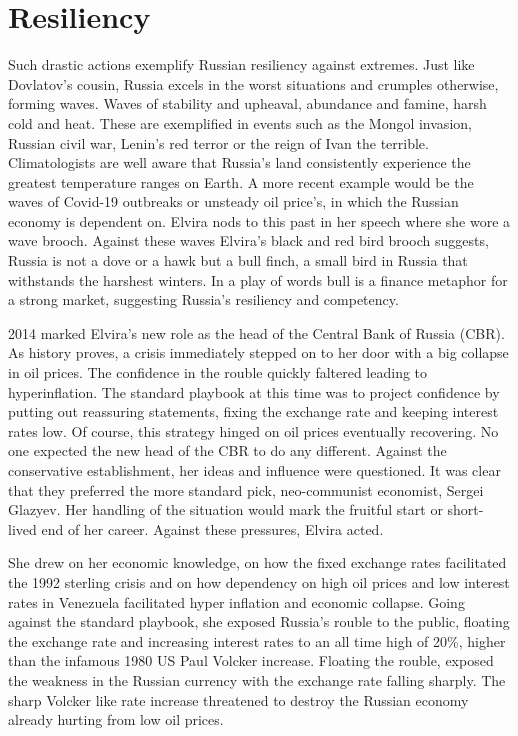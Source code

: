 \documentclass[12pt]{article}
\begin{document}
\section{Resiliency 
\label{sec:Resiliency}}
Such drastic actions exemplify Russian resiliency against extremes. Just like Dovlatov's cousin, Russia excels in the worst situations and crumples otherwise, forming waves. Waves of stability and upheaval, abundance and famine, harsh cold and heat. These are exemplified in events such as the Mongol invasion, Russian civil war, Lenin’s red terror or the reign of Ivan the terrible. Climatologists are well aware that Russia’s land consistently experience the greatest temperature ranges on Earth. A more recent example would be the waves of Covid-19 outbreaks or unsteady oil price’s, in which the Russian economy is dependent on. Elvira nods to this past in her speech where she wore a wave brooch. Against these waves Elvira’s black and red bird brooch suggests, Russia is not a dove or a hawk but a bull finch, a small bird in Russia that withstands the harshest winters. In a play of words bull is a finance metaphor for a strong market, suggesting Russia’s resiliency and competency. 

2014 marked Elvira’s new role as the head of the Central Bank of Russia (CBR). As history proves, a crisis immediately stepped on to her door with a big collapse in oil prices. The confidence in  the rouble quickly faltered leading to hyperinflation. The standard playbook at this time was to project confidence by putting out reassuring statements, fixing the exchange rate and keeping interest rates low. Of course, this strategy hinged on oil prices eventually recovering. No one expected the new head of the CBR to do any different. Against the conservative establishment, her ideas and influence were questioned. It was clear that they preferred the more standard pick, neo-communist economist, Sergei Glazyev. Her handling of the situation would mark the fruitful start or short-lived end of her career. Against these pressures, Elvira acted.

She drew on her economic knowledge, on how the fixed exchange rates facilitated the 1992 sterling  crisis and on how dependency on high oil prices and low interest rates in Venezuela facilitated hyper inflation and economic collapse. Going against the standard playbook, she exposed Russia’s rouble to the public, floating the exchange rate and increasing interest rates to an all time high of 20\%, higher than the infamous 1980 US Paul Volcker increase. Floating the rouble, exposed the weakness in the Russian currency with the exchange rate falling sharply. The sharp Volcker like rate increase threatened to destroy the Russian economy already hurting from low oil prices. 
\end{document}
